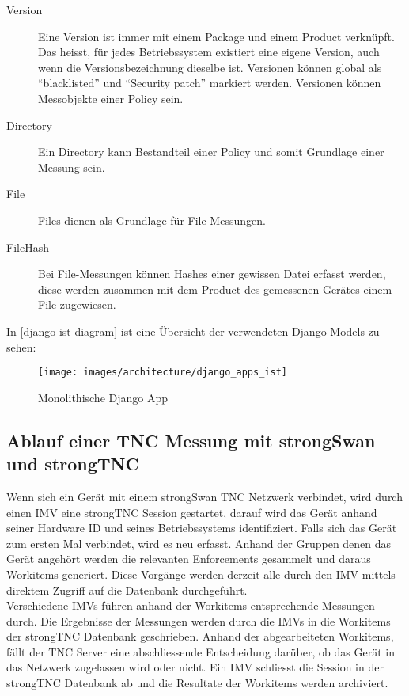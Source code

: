 \begin{description}
	\item[Version] Eine Version ist immer mit einem Package und einem Product
	verknüpft. Das heisst, für jedes Betriebssystem existiert eine eigene Version,
	auch wenn die Versionsbezeichnung dieselbe ist. Versionen können global als
	\enquote{blacklisted} und \enquote{Security patch} markiert werden. Versionen
	können Messobjekte einer Policy sein.

	\item[Directory] Ein Directory kann Bestandteil einer Policy und somit
	Grundlage einer Messung sein.

	\item[File] Files dienen als Grundlage für File-Messungen.

	\item[FileHash] Bei File-Messungen können Hashes einer gewissen Datei erfasst
	werden, diese werden zusammen mit dem Product des gemessenen Gerätes einem
	File zugewiesen.
	
\end{description}

In \autoref{django-ist-diagram} ist eine Übersicht der verwendeten Django-Models
zu sehen:
\begin{figure}[H]
	\centering
	\texttt{[image: images/architecture/django\_apps\_ist]}
	\caption{Monolithische Django App}
	\label{django-ist-diagram}
\end{figure}

\subsection{Ablauf einer TNC Messung mit strongSwan und strongTNC}
Wenn sich ein Gerät mit einem strongSwan TNC Netzwerk verbindet, wird durch einen
IMV eine strongTNC Session gestartet, darauf wird das Gerät anhand seiner
Hardware ID und seines Betriebssystems identifiziert. Falls sich das Gerät zum
ersten Mal verbindet, wird es neu erfasst. Anhand der Gruppen denen das Gerät
angehört werden die relevanten Enforcements gesammelt und daraus Workitems
generiert. Diese Vorgänge werden derzeit alle durch den IMV mittels direktem
Zugriff auf die Datenbank durchgeführt.\\
Verschiedene IMVs führen anhand der Workitems entsprechende Messungen durch. Die
Ergebnisse der Messungen werden durch die IMVs in die Workitems der strongTNC
Datenbank geschrieben. Anhand der abgearbeiteten Workitems, fällt der TNC Server
eine abschliessende Entscheidung darüber, ob das Gerät in das Netzwerk
zugelassen wird oder nicht. Ein IMV schliesst die Session in der strongTNC
Datenbank ab und die Resultate der Workitems werden archiviert.\\

